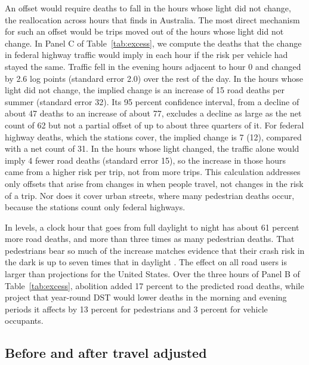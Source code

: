 An offset would require deaths to fall in the hours whose light did not change, the reallocation across hours that \citet{james2023let} finds in Australia. The most direct mechanism for such an offset would be trips moved out of the hours whose light did not change. In Panel C of Table~\ref{tab:excess}, we compute the deaths that the change in federal highway traffic would imply in each hour if the risk per vehicle had stayed the same. Traffic fell in the evening hours adjacent to hour 0 and changed by 2.6 log points (standard error 2.0) over the rest of the day. In the hours whose light did not change, the implied change is an increase of 15 road deaths per summer (standard error 32). Its 95 percent confidence interval, from a decline of about 47 deaths to an increase of about 77, excludes a decline as large as the net count of 62 but not a partial offset of up to about three quarters of it. For federal highway deaths, which the stations cover, the implied change is 7 (12), compared with a net count of 31. In the hours whose light changed, the traffic alone would imply 4 fewer road deaths (standard error 15), so the increase in those hours came from a higher risk per trip, not from more trips. This calculation addresses only offsets that arise from changes in when people travel, not changes in the risk of a trip. Nor does it cover urban streets, where many pedestrian deaths occur, because the stations count only federal highways.

In levels, a clock hour that goes from full daylight to night has about 61 percent more road deaths, and more than three times as many pedestrian deaths. That pedestrians bear so much of the increase matches evidence that their crash risk in the dark is up to seven times that in daylight \citep{sullivan2002role}. The effect on all road users is larger than projections for the United States. Over the three hours of Panel B of Table~\ref{tab:excess}, abolition added 17 percent to the predicted road deaths, while \citet{coate2004effects} project that year-round DST would lower deaths in the morning and evening periods it affects by 13 percent for pedestrians and 3 percent for vehicle occupants.
\subsection{Before and after travel adjusted}\label{sec:transitions}


